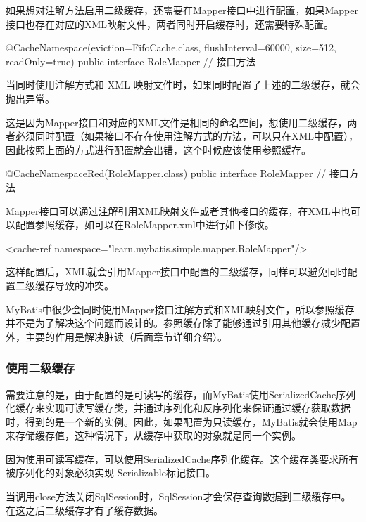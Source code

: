 如果想对注解方法启用二级缓存，还需要在Mapper接口中进行配置，如果Mapper接口也存在对应的XML映射文件，两者同时开启缓存时，还需要特殊配置。

\begin{Java}
@CacheNamespace(eviction=FifoCache.class, flushInterval=60000, size=512, readOnly=true)
public interface RoleMapper{
    // 接口方法
}
\end{Java}

当同时使用注解方式和 XML 映射文件时，如果同时配置了上述的二级缓存，就会抛出异常。

这是因为Mapper接口和对应的XML文件是相同的命名空间，想使用二级缓存，两者必须同时配置（如果接口不存在使用注解方式的方法，可以只在XML中配置），因此按照上面的方式进行配置就会出错，这个时候应该使用参照缓存。

\begin{Java}
@CacheNamespaceRed(RoleMapper.class)
public interface RoleMapper {
    // 接口方法
}
\end{Java}

Mapper接口可以通过注解引用XML映射文件或者其他接口的缓存，在XML中也可以配置参照缓存，如可以在RoleMapper.xml中进行如下修改。

\begin{xml}
<cache-ref namespace="learn.mybatis.simple.mapper.RoleMapper"/>
\end{xml}

这样配置后，XML就会引用Mapper接口中配置的二级缓存，同样可以避免同时配置二级缓存导致的冲突。

MyBatis中很少会同时使用Mapper接口注解方式和XML映射文件，所以参照缓存并不是为了解决这个问题而设计的。参照缓存除了能够通过引用其他缓存减少配置外，主要的作用是解决脏读（后面章节详细介绍）。

\subsubsection{使用二级缓存}

需要注意的是，由于配置的是可读写的缓存，而MyBatis使用SerializedCache序列化缓存来实现可读写缓存类，并通过序列化和反序列化来保证通过缓存获取数据时，得到的是一个新的实例。因此，如果配置为只读缓存，MyBatis就会使用Map来存储缓存值，这种情况下，从缓存中获取的对象就是同一个实例。

因为使用可读写缓存，可以使用SerializedCache序列化缓存。这个缓存类要求所有被序列化的对象必须实现 Serializable标记接口。

当调用close方法关闭SqlSession时，SqlSession才会保存查询数据到二级缓存中。在这之后二级缓存才有了缓存数据。


